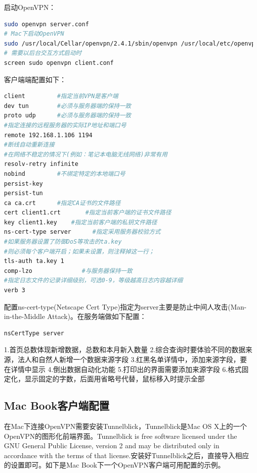 \documentclass[letter]{book}
\begin{document}
启动OpenVPN：

\begin{lstlisting}[language=Bash]
sudo openvpn server.conf
# Mac下启动OpenVPN
sudo /usr/local/Cellar/openvpn/2.4.1/sbin/openvpn /usr/local/etc/openvpn/client.conf
# 需要以后台交互方式启动时
screen sudo openvpn client.conf
\end{lstlisting}

客户端端配置如下：

\begin{lstlisting}[language=Bash]
client         #指定当前VPN是客户端
dev tun        #必须与服务器端的保持一致
proto udp      #必须与服务器端的保持一致
#指定连接的远程服务器的实际IP地址和端口号
remote 192.168.1.106 1194      
#断线自动重新连接
#在网络不稳定的情况下(例如：笔记本电脑无线网络)非常有用
resolv-retry infinite
nobind         #不绑定特定的本地端口号
persist-key
persist-tun
ca ca.crt      #指定CA证书的文件路径
cert client1.crt       #指定当前客户端的证书文件路径
key client1.key    #指定当前客户端的私钥文件路径
ns-cert-type server      #指定采用服务器校验方式
#如果服务器设置了防御DoS等攻击的ta.key
#则必须每个客户端开启；如果未设置，则注释掉这一行；
tls-auth ta.key 1     
comp-lzo              #与服务器保持一致
#指定日志文件的记录详细级别，可选0-9，等级越高日志内容越详细
verb 3                
\end{lstlisting}

配置ns-cert-type(Netscape Cert Type)指定为server主要是防止中间人攻击(Man-in-the-Middle Attack)。在服务端做如下配置：

\begin{lstlisting}[language=Bash]
nsCertType server
\end{lstlisting}

1.首页总数体现新增数据，总数和本月新入数量
2.综合查询时要体验不同的数据来源，法人和自然人新增一个数据来源字段
3.红黑名单详情中，添加来源字段，要在详情中显示
4.倒出数据自动化功能
5.打印出的界面需要添加来源字段
6.格式固定化，显示固定的字数，后面用省略号代替，鼠标移入时提示全部

\subsection{Mac Book客户端配置}

在Mac下连接OpenVPN需要安装Tunnelblick，Tunnelblick是Mac OS X上的一个OpenVPN的图形化前端界面。Tunnelblick is free software licensed under the GNU General Public License, version 2 and may be distributed only in accordance with the terms of that license.安装好Tunnelblick之后，直接导入相应的设置即可。如下是Mac Book下一个OpenVPN客户端可用配置的示例。
\end{document}
